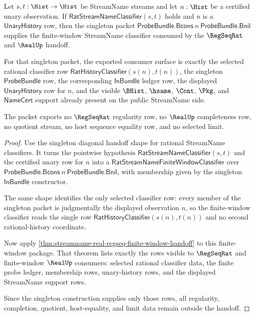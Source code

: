 \begin{theorem}
\label{thm:streamname-singleton-regseq-real-handoff-exactness}
Let $s,t:\Hist\to\Hist$ be StreamName streams and let $n:\Hist$ be a
certified unary observation. If $\mathsf{RatStreamNameClassifier}(s,t)$
holds and $n$ is a $\mathsf{UnaryHistory}$ row, then the singleton packet
$\mathsf{ProbeBundle.Bcons}\ n\ \mathsf{ProbeBundle.Bnil}$ supplies the
finite-window StreamName classifier consumed by the $\RegSeqRat$ and
$\RealUp$ handoff.

For that singleton packet, the exported consumer surface is exactly the
selected rational classifier row
$\mathsf{RatHistoryClassifier}(s(n),t(n))$, the singleton
$\mathsf{ProbeBundle}$ row, the corresponding $\mathsf{InBundle}$ ledger
row, the displayed $\mathsf{UnaryHistory}$ row for $n$, and the visible
$\BHist$, $\hsame$, $\Cont$, $\Pkg$, and $\mathsf{NameCert}$ support already
present on the public StreamName side.

The packet exports no $\RegSeqRat$ regularity row, no $\RealUp$
completeness row, no quotient stream, no host sequence equality row, and no
selected limit.
\end{theorem}
\begin{proof}
Use the singleton diagonal handoff shape for rational StreamName classifiers.
It turns the pointwise hypothesis $\mathsf{RatStreamNameClassifier}(s,t)$ and
the certified unary row for $n$ into a
$\mathsf{RatStreamNameFiniteWindowClassifier}$ over
$\mathsf{ProbeBundle.Bcons}\ n\ \mathsf{ProbeBundle.Bnil}$, with membership
given by the singleton $\mathsf{InBundle}$ constructor.

The same shape identifies the only selected classifier row: every member of
the singleton packet is judgmentally the displayed observation $n$, so the
finite-window classifier reads the single row
$\mathsf{RatHistoryClassifier}(s(n),t(n))$ and no second rational-history
coordinate.

Now apply
\autoref{thm:streamname-real-regseq-finite-window-handoff} to this
finite-window package. That theorem lists exactly the rows visible to
$\RegSeqRat$ and finite-window $\RealUp$ consumers: selected rational
classifier data, the finite probe ledger, membership rows, unary-history rows,
and the displayed StreamName support rows.

Since the singleton construction supplies only those rows, all regularity,
completion, quotient, host-equality, and limit data remain outside the
handoff.
\end{proof}

